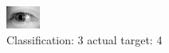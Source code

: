 \begin{figure}[h!]
\begin{center}
\includegraphics[width=0.60\columnwidth]{figures/ID3203_class_3_target_4.png}
\end{center}
\caption{ Classification: 3 actual target: 4}
\label{fig:ID3203_class_3_target_4}
\end{figure}
